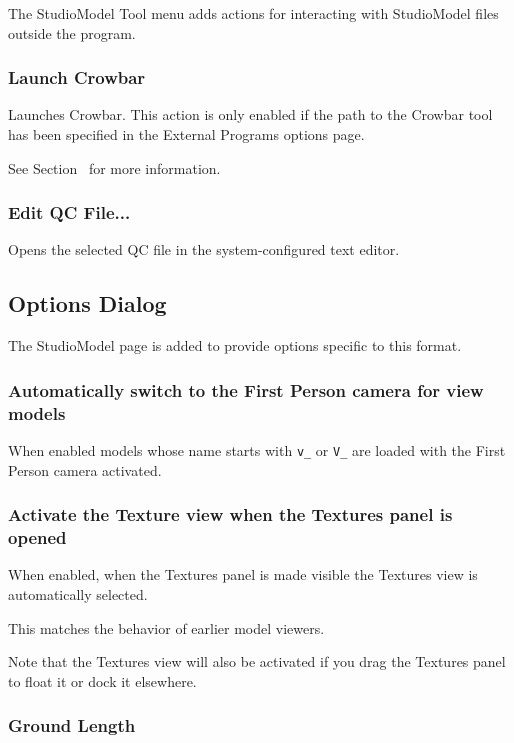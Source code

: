\documentclass[10pt, a4paper, titlepage, oneside]{article}
\newcommand{\code}[1]{\mbox{\texttt{#1}}}
\begin{document}
The StudioModel Tool menu adds actions for interacting with StudioModel files outside the program.

\subsubsection{Launch Crowbar}

Launches Crowbar. This action is only enabled if the path to the Crowbar tool has been specified in the External Programs options page.

See Section~ for more information.

\subsubsection{Edit QC File...}

Opens the selected QC file in the system-configured text editor.

\newpage

\subsection{Options Dialog}

The StudioModel page is added to provide options specific to this format.

\subsubsection{Automatically switch to the First Person camera for view models}

When enabled models whose name starts with \code{v\_} or \code{V\_} are loaded with the First Person camera activated.

\subsubsection{Activate the Texture view when the Textures panel is opened}

When enabled, when the Textures panel is made visible the Textures view is automatically selected.

This matches the behavior of earlier model viewers.

Note that the Textures view will also be activated if you drag the Textures panel to float it or dock it elsewhere.

\subsubsection{Ground Length}
\end{document}

